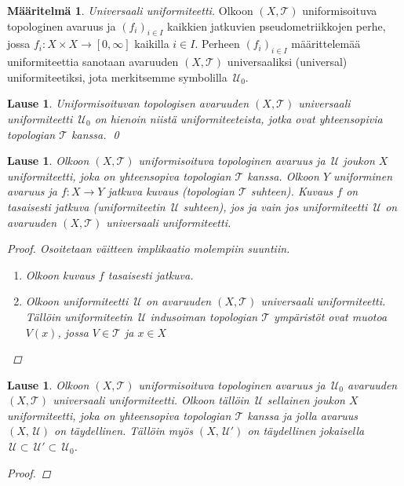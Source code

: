 \documentclass[12pt,a4paper,leqno]{report}
\newcommand{\U}{\,\mathcal{U}}
\newcommand{\T}{\mathcal{T}}
\theoremstyle{plain}
\newtheorem{lause}[equation]{Lause}
\theoremstyle{definition}
\newtheorem{maar}[equation]{Määritelmä}
\theoremstyle{remark}
\begin{document}
\begin{maar}
\emph{Universaali uniformiteetti.} 
Olkoon $(X,\T)$ uniformisoituva topologinen avaruus ja 
$(f_i)_{i\in I}$ kaikkien jatkuvien pseudometriikkojen perhe, 
jossa $f_i\colon X\times X\rightarrow [0,\infty]$ 
kaikilla $i\in I$. 
Perheen $(f_i)_{i\in I}$ määrittelemää uniformiteettia sanotaan avaruuden $(X,\T)$ universaaliksi (universal) uniformiteetiksi, 
jota merkitsemme symbolilla $\U_0$. 
\end{maar}
\begin{lause}
Uniformisoituvan topologisen avaruuden $(X,\T)$ universaali uniformiteetti $\U_0$ on hienoin niistä uniformiteeteista, jotka ovat yhteensopivia topologian $\T$ kanssa. 
\qed
\end{lause}
\begin{lause}
Olkoon $(X,\T)$ uniformisoituva topologinen avaruus ja 
$\U$ joukon $X$ uniformiteetti, joka on yhteensopiva topologian $\T$ kanssa. 
Olkoon $Y$ uniforminen avaruus ja $f\colon X\rightarrow Y$ 
jatkuva kuvaus (topologian $\T$ suhteen). 
Kuvaus $f$ on tasaisesti jatkuva (uniformiteetin $\U$ suhteen), 
jos ja vain jos uniformiteetti $\U$ on 
avaruuden $(X,\T)$ universaali uniformiteetti. 
\begin{proof}
Osoitetaan väitteen implikaatio molempiin suuntiin.
\begin{enumerate}
\item[$\Rightarrow$]
Olkoon kuvaus $f$ tasaisesti jatkuva. 
\item[$\Leftarrow$]
Olkoon uniformiteetti $\U$ on 
avaruuden $(X,\T)$ universaali uniformiteetti. 
Tällöin uniformiteetin $\U$ indusoiman topologian $\T$ ympäristöt ovat muotoa $ V(x)$, jossa $V\in\T$ ja $x\in X$
\end{enumerate}
\end{proof}
\end{lause}
\begin{lause}
Olkoon $(X,\T)$ uniformisoituva topologinen avaruus ja 
$\U_0$ avaruuden $(X,\T)$ universaali uniformiteetti. 
Olkoon tällöin  
$\U$ sellainen joukon $X$ uniformiteetti, 
joka on yhteensopiva topologian $\T$ kanssa ja 
jolla avaruus $(X,\U)$ on täydellinen. 
Tällöin myös $(X,\U')$ on täydellinen jokaisella 
$\U\subset\U'\subset\U_0$.
\begin{proof}
\end{proof}
\end{lause}
%
%
\end{document}
